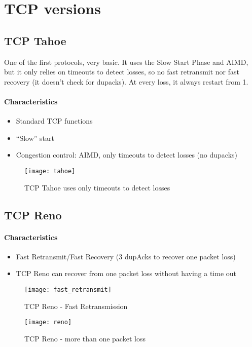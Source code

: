 \newpage
\section{TCP versions}

\subsection{TCP Tahoe}
One of the first protocols, very basic. It uses the Slow Start Phase and 
AIMD, but it only relies on timeouts to detect losses, so no fast retransmit nor 
fast recovery (it doesn't check for dupacks). At every loss, it always restart 
from 1.

\paragraph*{Characteristics}
\begin{itemize}
  \item Standard TCP functions
  \item ``Slow'' start
  \item Congestion control: AIMD, only timeouts to detect losses (no dupacks)
\end{itemize}

\begin{figure}[h]
  \texttt{[image: tahoe]}
  \caption[TCP Tahoe]{TCP Tahoe uses only timeouts to detect losses}
\end{figure}

\subsection{TCP Reno}
\paragraph*{Characteristics}
\begin{itemize}
  \item Fast Retransmit/Fast Recovery (3 dupAcks to recover one packet loss)
  \item TCP Reno can recover from one packet loss without having a time out
\end{itemize}

\begin{figure}[h]
  \texttt{[image: fast\_retransmit]}
  \caption[TCP Reno 1]{TCP Reno - Fast Retransmission}
\end{figure}

\begin{figure}[h]
  \texttt{[image: reno]}
  \caption[TCP Reno 2]{TCP Reno - more than one packet loss}
\end{figure}

